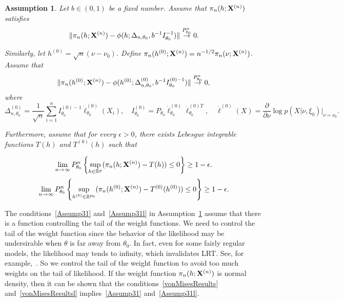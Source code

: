 \documentclass[11pt]{article}
\theoremstyle{plain}
\newtheorem{assumption}{\quad\quad Assumption}
\theoremstyle{definition}
\theoremstyle{remark}
\begin{document}
\begin{assumption}\label{Assumption3}
    Let $b\in(0,1)$ be a fixed number.
    Assume that $\pi_n(h;\mathbf{X}^{(n)})$ satisfies
        \begin{equation}\label{vonMisesResults}
            \|\pi_n(h;\mathbf{X}^{(n)})-\phi(h;\Delta_{n,\theta_0},b^{-1}I_{\theta_0}^{-1})\|\overset{P_{\theta_0}^n}{\to}0.
        \end{equation}

        Similarly, let $h^{(0)}=\sqrt{n}(\nu-\nu_0)$. Define $\pi_n(h^{(0)};\mathbf{X}^{(n)})=n^{-1/2}\pi_n(\nu;\mathbf{X}^{(n)})$. Assume that 
\begin{equation}\label{vonMisesResultsl}
    \|\pi_n(h^{(0)};\mathbf{X}^{(n)})-\phi(h^{(0)};\Delta^{(0)}_{n,\theta_0},b^{-1}I_{\theta_0}^{(0)-1})\|\overset{P_{\theta_0}^n}{\to}0,
\end{equation}
where $$ \Delta_{n,\theta_0}^{(0)}
=\frac{1}{\sqrt{n}}\sum_{i=1}^n I_{\theta_0}^{(0)-1}\dot{\ell}^{(0)}_{\theta_0}(X_i),
\quad I^{(0)}_{\theta_0}=P_{\theta_0}\dot{\ell}_{\theta_0}^{(0)}\dot{\ell}_{\theta_0}^{(0)T},\quad 
\dot{\ell}^{(0)}(X)=\frac{\partial}{\partial \nu}\log p(X|\nu,\xi_0)\Big|_{\nu=\nu_0}
.
$$

Furthermore, assume that for every $\epsilon>0$, there exists Lebesgue integrable functions $T(h)$ and $T^{(0)}(h)$ such that 

    \begin{equation}\label{Assump31}
        \lim_{n\to \infty}P_{\theta_0}^n\left\{\sup_{h\in \mathbb{R}^p}(\pi_n(h;\mathbf{X}^{(n)})-T(h))\leq 0\right\}\geq 1-\epsilon.
\end{equation}
    \begin{equation}\label{Assump31l}
        \lim_{n\to \infty}P_{\theta_0}^n\left\{\sup_{h^{(0)}\in \mathbb{R}^{p_0}}(\pi_n(h^{(0)};\mathbf{X}^{(n)})-T^{(0)}(h^{(0)}))\leq 0\right\}\geq 1-\epsilon.
\end{equation}


\end{assumption}
The conditions~\eqref{Assump31} and~\eqref{Assump31l} in Assumption~\ref{Assumption3} assume that there is a function controlling the tail of the weight functions.
We need to control the tail of the weight function since the behavior of the likelihood may be undersirable when $\theta$ is far away from $\theta_0$.
In fact, even for some fairly regular models, the likelihood may tends to infinity, which invalidates LRT.
See, for example,~\cite{Cam1990Maximum}.
So we control the tail of the weight function to avoid too much weights on the tail of likelihood.
If the weight function $\pi_n(h;\mathbf{X}^{(n)})$ is normal density, then it can be shown that the conditions~\eqref{vonMisesResults} and~\eqref{vonMisesResultsl} implies~\eqref{Assump31} and~\eqref{Assump31l}.
\end{document}
